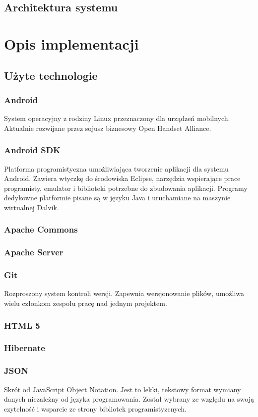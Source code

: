 \documentclass[11pt,a4paper,polish,thesis]{dcsbook}
\begin{document}
\section{Architektura systemu}


\chapter{Opis implementacji}
\section{Użyte technologie}
\subsection{Android}
System operacyjny z rodziny Linux przeznaczony dla urządzeń mobilnych. Aktualnie rozwijane przez sojusz biznesowy Open Handset Alliance.
\subsection{Android SDK}
Platforma programistyczna umożliwiająca tworzenie aplikacji dla systemu Android. Zawiera wtyczkę do środowiska Eclipse, narzędzia wspierające prace programisty, emulator i biblioteki potrzebne do zbudowania aplikacji. Programy dedykowne platformie pisane są w języku Java i uruchamiane na maszynie wirtualnej Dalvik.
\subsection{Apache Commons}
\subsection{Apache Server}
\subsection{Git}
Rozproszony system kontroli wersji. Zapewnia wersjonowanie plików, umożliwa wielu członkom zespołu pracę nad jednym projektem.
\subsection{HTML 5}
\subsection{Hibernate}
\subsection{JSON}
Skrót od JavaScript Object Notation. Jest to lekki, tekstowy format wymiany danych niezależny od języka programowania. Został wybrany ze względu na swoją czytelność i wsparcie ze strony bibliotek programistyzcnych.
\end{document}
